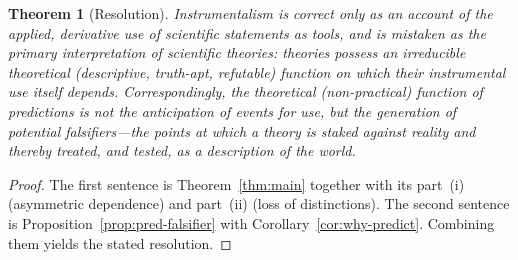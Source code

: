 \documentclass{amsart}
\theoremstyle{definition}
\theoremstyle{plain}
\newtheorem{theorem}{Theorem}
\begin{document}
\begin{theorem}[Resolution]\label{thm:resolution}
Instrumentalism is correct only as an account of the \emph{applied},
derivative use of scientific statements as tools, and is \emph{mistaken} as the
primary interpretation of scientific theories: theories possess an irreducible
theoretical (descriptive, truth-apt, refutable) function on which their
instrumental use itself depends. Correspondingly, the theoretical
(non-practical) function of predictions is not the anticipation of events for
use, but the generation of potential falsifiers---the points at which a theory
is staked against reality and thereby treated, and tested, as a description of
the world.
\end{theorem}

\begin{proof}
The first sentence is Theorem~\ref{thm:main} together with its part~(i)
(asymmetric dependence) and part~(ii) (loss of distinctions). The second
sentence is Proposition~\ref{prop:pred-falsifier} with
Corollary~\ref{cor:why-predict}. Combining them yields the stated resolution.
\end{proof}
\end{document}
